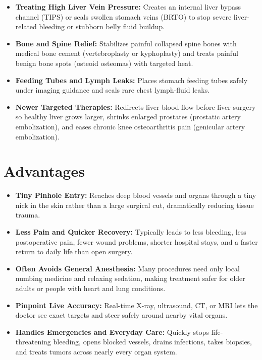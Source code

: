 \begin{itemize}
    \item \textbf{Treating High Liver Vein Pressure:} Creates an internal liver bypass channel (TIPS) or seals swollen stomach veins (BRTO) to stop severe liver-related bleeding or stubborn belly fluid buildup.
    \item \textbf{Bone and Spine Relief:} Stabilizes painful collapsed spine bones with medical bone cement (vertebroplasty or kyphoplasty) and treats painful benign bone spots (osteoid osteomas) with targeted heat.
    \item \textbf{Feeding Tubes and Lymph Leaks:} Places stomach feeding tubes safely under imaging guidance and seals rare chest lymph-fluid leaks.
    \item \textbf{Newer Targeted Therapies:} Redirects liver blood flow before liver surgery so healthy liver grows larger, shrinks enlarged prostates (prostatic artery embolization), and eases chronic knee osteoarthritis pain (genicular artery embolization).
\end{itemize}

\section{Advantages}

\begin{itemize}
    \item \textbf{Tiny Pinhole Entry:} Reaches deep blood vessels and organs through a tiny nick in the skin rather than a large surgical cut, dramatically reducing tissue trauma.
    \item \textbf{Less Pain and Quicker Recovery:} Typically leads to less bleeding, less postoperative pain, fewer wound problems, shorter hospital stays, and a faster return to daily life than open surgery.
    \item \textbf{Often Avoids General Anesthesia:} Many procedures need only local numbing medicine and relaxing sedation, making treatment safer for older adults or people with heart and lung conditions.
    \item \textbf{Pinpoint Live Accuracy:} Real-time X-ray, ultrasound, CT, or MRI lets the doctor see exact targets and steer safely around nearby vital organs.
    \item \textbf{Handles Emergencies and Everyday Care:} Quickly stops life-threatening bleeding, opens blocked vessels, drains infections, takes biopsies, and treats tumors across nearly every organ system.
\end{itemize}

